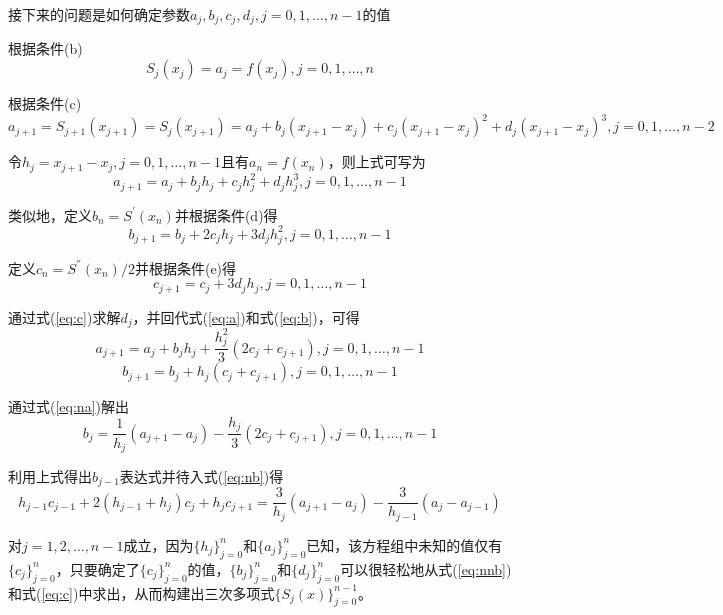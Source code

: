 \documentclass[12pt]{ctexart}
\begin{document}
	接下来的问题是如何确定参数$a_j,b_j,c_j,d_j,j=0,1,\dots,n-1$的值
	
	根据条件(b)
	\begin{equation*}
	S_j(x_j)=a_j=f(x_j),j=0,1,\dots,n
	\end{equation*}
	
	根据条件(c)
	\begin{equation*}
	a_{j+1}=S_{j+1}(x_{j+1})=S_j(x_{j+1})=a_j+b_j(x_{j+1}-x_j)+c_j(x_{j+1}-x_j)^2+d_j(x_{j+1}-x_j)^3,j=0,1,\dots,n-2
	\end{equation*}
	
	令$h_j=x_{j+1}-x_j,j=0,1,\dots,n-1$且有$a_n=f(x_n)$，则上式可写为
	\begin{equation}
	a_{j+1}=a_j+b_jh_j+c_jh_j^2+d_jh_j^3,j=0,1,\dots,n-1\label{eq:a}
	\end{equation}
	
	类似地，定义$b_n=S^{'}(x_n)$并根据条件(d)得
	\begin{equation}
	b_{j+1}=b_j+2c_jh_j+3d_jh_j^2,j=0,1,\dots,n-1\label{eq:b}
	\end{equation}
	
	定义$c_n=S^{''}(x_n)/2$并根据条件(e)得
	\begin{equation}
	c_{j+1}=c_j+3d_jh_j,j=0,1,\dots,n-1\label{eq:c}
	\end{equation}
	
	通过式(\ref{eq:c})求解$d_j$，并回代式(\ref{eq:a})和式(\ref{eq:b})，可得
	\begin{equation}
	a_{j+1}=a_j+b_jh_j+\frac{h_j^2}{3}(2c_j+c_{j+1}),j=0,1,\dots,n-1\label{eq:na}
	\end{equation}
	\begin{equation}
	b_{j+1}=b_j+h_j(c_j+c_{j+1}),j=0,1,\dots,n-1\label{eq:nb}
	\end{equation}
	
	通过式(\ref{eq:na})解出
	\begin{equation}
	b_j=\frac{1}{h_j}(a_{j+1}-a_j)-\frac{h_j}{3}(2c_j+c_{j+1}),j=0,1,\dots,n-1\label{eq:nnb}
	\end{equation}
	
	利用上式得出$b_{j-1}$表达式并待入式(\ref{eq:nb})得
	\begin{equation}
	h_{j-1}c_{j-1}+2(h_{j-1}+h_j)c_j+h_jc_{j+1}=\frac{3}{h_j}(a_{j+1}-a_j)-\frac{3}{h_{j-1}}(a_j-a_{j-1})\label{linear system}
	\end{equation}
	
	对$j=1,2,\dots,n-1$成立，因为$\{h_j\}_{j=0}^n$和$\{a_j\}_{j=0}^n$已知，该方程组中未知的值仅有$\{c_j\}_{j=0}^n$，只要确定了$\{c_j\}_{j=0}^n$的值，$\{b_j\}_{j=0}^n$和$\{d_j\}_{j=0}^n$可以很轻松地从式(\ref{eq:nnb})和式(\ref{eq:c})中求出，从而构建出三次多项式$\{S_j(x)\}_{j=0}^{n-1}$。
	
\end{document}
